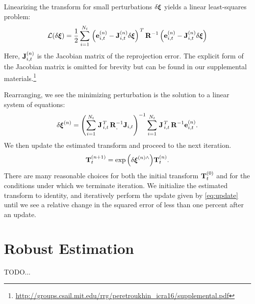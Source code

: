 Linearizing the transform for small perturbations $\delta\boldsymbol{\mathbf{\xi}}$
yields a linear least-squares problem:
\begin{equation}
  \mathcal{L}(\delta \boldsymbol{\mathbf{\xi}}) = \frac{1}{2}\sum_{i=1}^{N_t} 
  \left.{\left(\boldsymbol{\mathbf{e}}_{i,t}^{(n)}
  - \boldsymbol{\mathbf{J}}_{i,t}^{(n)} \delta\boldsymbol{\mathbf{\xi}}\right)}\right.^T
\boldsymbol{\mathbf{R}}^{-1}
 \left(\boldsymbol{\mathbf{e}}_{i,t}^{(n)}
 - \boldsymbol{\mathbf{J}}_{i,t}^{(n)} \delta\boldsymbol{\mathbf{\xi}}\right)
  \end{equation}
Here, $\boldsymbol{\mathbf{J}}_{i,t}^{(n)}$ is the Jacobian matrix of the reprojection error.
The explicit form of the Jacobian matrix is omitted for brevity but can be
found in our supplemental materials.\footnote{\url{http://groups.csail.mit.edu/rrg/peretroukhin_icra16/supplemental.pdf}}

Rearranging, we see the minimizing perturbation is the solution to a
linear system of equations:
\begin{equation}
  \delta\boldsymbol{\mathbf{\xi}}^{(n)} = 
  \left( \sum_{i=1}^{N_t} \left.{\boldsymbol{\mathbf{J}}}\right.^T_{i,t}
  \boldsymbol{\mathbf{R}}_{,}^{-1} \boldsymbol{\mathbf{J}}_{i,t} \right)^{-1}
  \sum_{i=1}^{N_t} \left.{\boldsymbol{\mathbf{J}}}\right.^T_{i,t}
  \boldsymbol{\mathbf{R}}^{-1} \boldsymbol{\mathbf{e}}_{i,t}^{(n)}. 
\label{eq:least-squares-iteration}
\end{equation}
We then update the estimated transform and proceed to the next iteration.
\begin{equation}
  \boldsymbol{\mathbf{T}}_t^{(n+1)} = \exp{\left( \delta \boldsymbol{\mathbf{\xi}} ^{(n)\wedge}
  \right)} \boldsymbol{\mathbf{T}}_t^{(n)}. \label{eq:update}
\end{equation}
There are many reasonable choices for both the initial transform
$\boldsymbol{\mathbf{T}}_t^{(0)}$ and for the conditions under which we terminate
iteration. We initialize the estimated transform to identity, and iteratively
perform the update given by \cref{eq:update} until we see a relative change in
the squared error of less than one percent after an update. 

\section{Robust Estimation}

TODO...
 